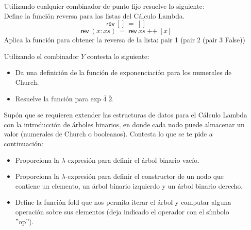                 \begin{exercise}
                    Utilizando cualquier combinador de punto fijo resuelve lo siguiente:\\
                    
                    Define la función reversa para las listas del Cálculo Lambda. \\
                    \[
                        \textsf{rev}\ []\ =\ []
                    \]
                    \[
                        \textsf{rev}\ (x:xs)\ =\ \textsf{rev}\ xs\ \text{++}\ [x]
                    \]
                    Aplica la función para obtener la reversa de la lista: \textsf{pair 1 (pair 2 (pair 3 False))}
                \end{exercise}



                \begin{exercise}
                    Utilizando el combinador $Y$ contesta lo siguiente: \\
                    \begin{itemize}
                    	\item Da una definición de la función de exponenciación para los numerales de Church.
                    	\item Resuelve la función para \textsf{exp} $\overline{4} \; \overline{2}$.
		    \end{itemize}
                \end{exercise}


		\begin{exercise}
			Supón que se requieren extender las estructuras de datos para el Cálculo Lambda con la introducción de árboles binarios, en donde cada nodo puede almacenar un valor (numerales de Church o booleanos). Contesta lo que se te pide a continuación:\\
			\begin{itemize}
				\item Proporciona la $\lambda$-expresión para definir el árbol binario vacío.
				\item Proporciona la $\lambda$-expresión para definir el constructor de un nodo que contiene un elemento, un árbol binario izquierdo y un árbol binario derecho.
				\item Define la función \textsf{fold} que nos permita iterar el árbol y computar alguna operación sobre sus elementos (deja indicado el operador con el símbolo ''op'').
			\end{itemize}
		\end{exercise}



